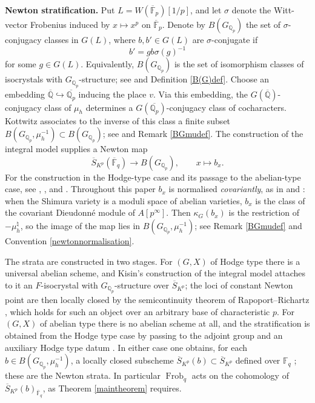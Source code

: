 \documentclass[11pt,a4paper]{article}
\theoremstyle{definition}
\theoremstyle{plain}
\theoremstyle{remark}
\theoremstyle{plain}
\DeclareMathOperator{\Frob}{Frob}
\begin{document}
\textbf{Newton stratification.}
Put $L=W(\overline{\mathbb{F}}_p)[1/p]$, and let $\sigma$ denote the Witt-vector Frobenius induced by $x\mapsto x^p$ on $\overline{\mathbb{F}}_p$. Denote by $B(G_{\mathbb{Q}_p})$ the set of $\sigma$-conjugacy classes in $G(L)$, where $b,b'\in G(L)$ are $\sigma$-conjugate if
$$
    b'=g b\sigma(g)^{-1}
$$
for some $g\in G(L)$. Equivalently, $B(G_{\mathbb{Q}_p})$ is the set of isomorphism classes of isocrystals with $G_{\mathbb{Q}_p}$-structure; see \cite[\S 1]{MR1485921} and Definition \ref{B(G)def}. Choose an embedding $\overline{\mathbb{Q}}\hookrightarrow\overline{\mathbb{Q}_p}$ inducing the place $v$. Via this embedding, the $G(\overline{\mathbb{Q}})$-conjugacy class of $\mu_h$ determines a $G(\overline{\mathbb{Q}_p})$-conjugacy class of cocharacters. Kottwitz associates to the inverse of this class a finite subset $B(G_{\mathbb{Q}_p}, \mu_h^{-1}) \subset B(G_{\mathbb{Q}_p})$; see \cite[\S 6]{MR1485921} and Remark \ref{BGmudef}. The construction of the integral model supplies a Newton map
$$
\overline{S}_{K^p}(\overline{\mathbb{F}}_q)\longrightarrow B(G_{\mathbb{Q}_p}),
\qquad x\longmapsto b_x.
$$
For the construction in the Hodge-type case and its passage to the abelian-type case, see \cite[\S 1.3]{MR4484214}, \cite[\S 4.6]{MR3630089}, and \cite[\S\S 5.2, 6.2]{kisin2021stabletraceformulashimura}. Throughout this paper $b_x$ is normalised \textit{covariantly}, as in \cite{MR1044820} and \cite{kisin2021stabletraceformulashimura}: when the Shimura variety is a moduli space of abelian varieties, $b_x$ is the class of the covariant Dieudonn\'e module of $A[p^{\infty}]$. Then $\kappa_G(b_x)$ is the restriction of $-\mu_h^{\natural}$, so the image of the map lies in $B(G_{\mathbb{Q}_p},\mu_h^{-1})$; see Remark \ref{BGmudef} and Convention \ref{newtonnormalisation}.

The strata are constructed in two stages. For $(G,X)$ of Hodge type there is a universal abelian scheme, and Kisin's construction of the integral model attaches to it an $F$-isocrystal with $G_{\mathbb{Q}_p}$-structure over $\overline{S}_{K^p}$; the loci of constant Newton point are then locally closed by the semicontinuity theorem of Rapoport--Richartz \cite[Thm.~3.6]{MR1411570}, which holds for such an object over an arbitrary base of characteristic $p$. For $(G,X)$ of abelian type there is no abelian scheme at all, and the stratification is obtained from the Hodge type case by passing to the adjoint group and an auxiliary Hodge type datum \cite[\S 2.3]{MR4557079}. In either case one obtains, for each $b\in B(G_{\mathbb{Q}_p},\mu_h^{-1})$, a locally closed subscheme $\overline{S}_{K^p}(b)\subset\overline{S}_{K^p}$ defined over $\mathbb{F}_q$ \cite[Thm.~2.2.2, Thm.~2.3.6]{MR4557079}; these are the Newton strata. In particular $\Frob_q$ acts on the cohomology of $\overline{S}_{K^p}(b)_{\overline{\mathbb{F}}_q}$, as Theorem \ref{maintheorem} requires.
\end{document}
